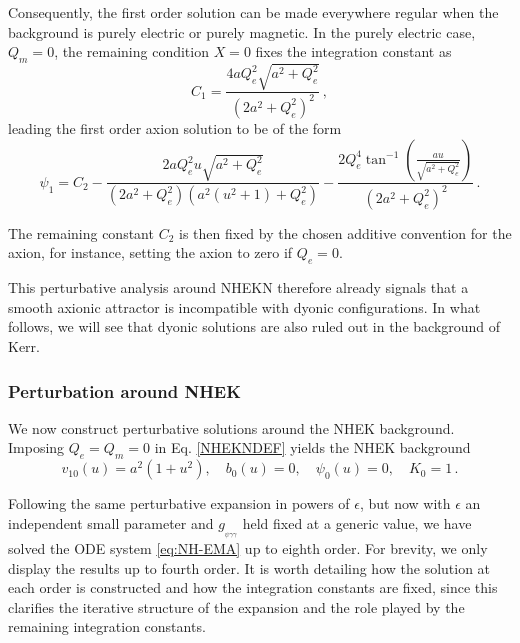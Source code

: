 \documentclass[11pt]{article}
\numberwithin{equation}{section} %
\begin{document}
Consequently, the first order solution can be made everywhere regular when the background is purely electric or purely magnetic. In the purely electric case, $Q_m=0$, the remaining condition $X=0$ fixes the integration constant as
%
\begin{equation}
    C_1=\frac{4 a Q_e^2 \sqrt{a^2+Q_e^2}}{\left(2 a^2+Q_e^2\right)^2}\,,
\end{equation}
leading the first order axion solution to be of the form
%
\begin{equation}
 \psi_1=  C_2 -\frac{2 a Q_e^2 u \sqrt{a^2+Q_e^2}}{\left(2 a^2+Q_e^2\right) \left(a^2 \left(u^2+1\right)+Q_e^2\right)}-\frac{2 Q_e^4 \tan ^{-1}\left(\frac{a u}{\sqrt{a^2+Q_e^2}}\right)}{\left(2 a^2+Q_e^2\right)^2}\,.
\end{equation}

The remaining constant \(C_2\) is then fixed by the chosen additive convention for the
axion, for instance, setting the axion to zero if $Q_e=0$.

This perturbative analysis around NHEKN therefore already signals that a smooth axionic attractor is incompatible with dyonic configurations. In what follows, we will see that dyonic solutions are also ruled out in the background of Kerr.
 \subsubsection{Perturbation around NHEK}\label{NHEK}

We now construct perturbative solutions around the NHEK background.  Imposing $Q_e=Q_m=0$  {in Eq. \eqref{NHEKNDEF}}  yields the NHEK background
\begin{equation}
   v_{10}(u) = a^2(1 + u^2), \quad b_0(u) = 0, \quad \psi_0(u) = 0, \quad K_0 = 1\,.
\end{equation}


Following the same perturbative expansion in powers of $\epsilon$, but now with $\epsilon$ an independent small parameter and $g_{_{\psi\gamma\gamma}}$ held fixed at a generic value, we have solved the ODE system \eqref{eq:NH-EMA} up to eighth order. For brevity, we only display the results up to fourth order. It is worth detailing how the solution at each order is constructed and how the integration constants are fixed, since this clarifies the iterative structure of the expansion and the role played by the remaining integration constants. 
\end{document}

